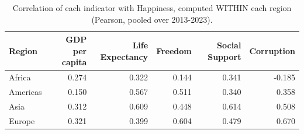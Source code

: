 \begin{table}
\caption{Correlation of each indicator with Happiness, computed WITHIN each region (Pearson, pooled over 2013-2023).}
\label{tab:corr-region}
\begin{tabular}{lrrrrr}
\toprule
Region & GDP per capita & Life Expectancy & Freedom & Social Support & Corruption \\
\midrule
Africa & 0.274 & 0.322 & 0.144 & 0.341 & -0.185 \\
Americas & 0.150 & 0.567 & 0.511 & 0.340 & 0.358 \\
Asia & 0.312 & 0.609 & 0.448 & 0.614 & 0.508 \\
Europe & 0.321 & 0.399 & 0.604 & 0.479 & 0.670 \\
\bottomrule
\end{tabular}
\end{table}
